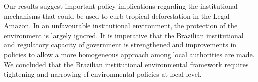 Our results suggest important policy implications regarding the institutional mechanisms that could be used to curb tropical deforestation in the Legal Amazon. In an unfavourable institutional environment, the protection of the environment is largely ignored. It is imperative that the Brazilian institutional and regulatory capacity of government is strengthened and improvements in policies to allow a more homogeneous approach among local authorities are made. We concluded that the Brazilian institutional environmental framework requires tightening and narrowing of environmental policies at local level.




\let\cleardoublepage\clearpage
\begin{appendices}
\renewcommand{\thechapter}{A.\arabic{chapter}}

\end{appendices}